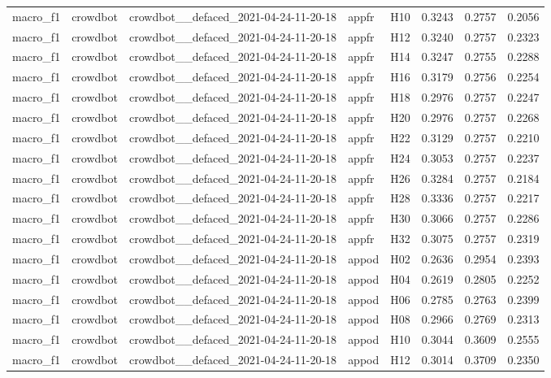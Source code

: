\begin{table}[tbp]
\begin{tabular}{lllllrrr}
macro\_f1 & crowdbot & crowdbot\_\_defaced\_2021-04-24-11-20-18 & appfr & H10 & 0.3243 & 0.2757 & 0.2056 \\
macro\_f1 & crowdbot & crowdbot\_\_defaced\_2021-04-24-11-20-18 & appfr & H12 & 0.3240 & 0.2757 & 0.2323 \\
macro\_f1 & crowdbot & crowdbot\_\_defaced\_2021-04-24-11-20-18 & appfr & H14 & 0.3247 & 0.2755 & 0.2288 \\
macro\_f1 & crowdbot & crowdbot\_\_defaced\_2021-04-24-11-20-18 & appfr & H16 & 0.3179 & 0.2756 & 0.2254 \\
macro\_f1 & crowdbot & crowdbot\_\_defaced\_2021-04-24-11-20-18 & appfr & H18 & 0.2976 & 0.2757 & 0.2247 \\
macro\_f1 & crowdbot & crowdbot\_\_defaced\_2021-04-24-11-20-18 & appfr & H20 & 0.2976 & 0.2757 & 0.2268 \\
macro\_f1 & crowdbot & crowdbot\_\_defaced\_2021-04-24-11-20-18 & appfr & H22 & 0.3129 & 0.2757 & 0.2210 \\
macro\_f1 & crowdbot & crowdbot\_\_defaced\_2021-04-24-11-20-18 & appfr & H24 & 0.3053 & 0.2757 & 0.2237 \\
macro\_f1 & crowdbot & crowdbot\_\_defaced\_2021-04-24-11-20-18 & appfr & H26 & 0.3284 & 0.2757 & 0.2184 \\
macro\_f1 & crowdbot & crowdbot\_\_defaced\_2021-04-24-11-20-18 & appfr & H28 & 0.3336 & 0.2757 & 0.2217 \\
macro\_f1 & crowdbot & crowdbot\_\_defaced\_2021-04-24-11-20-18 & appfr & H30 & 0.3066 & 0.2757 & 0.2286 \\
macro\_f1 & crowdbot & crowdbot\_\_defaced\_2021-04-24-11-20-18 & appfr & H32 & 0.3075 & 0.2757 & 0.2319 \\
macro\_f1 & crowdbot & crowdbot\_\_defaced\_2021-04-24-11-20-18 & appod & H02 & 0.2636 & 0.2954 & 0.2393 \\
macro\_f1 & crowdbot & crowdbot\_\_defaced\_2021-04-24-11-20-18 & appod & H04 & 0.2619 & 0.2805 & 0.2252 \\
macro\_f1 & crowdbot & crowdbot\_\_defaced\_2021-04-24-11-20-18 & appod & H06 & 0.2785 & 0.2763 & 0.2399 \\
macro\_f1 & crowdbot & crowdbot\_\_defaced\_2021-04-24-11-20-18 & appod & H08 & 0.2966 & 0.2769 & 0.2313 \\
macro\_f1 & crowdbot & crowdbot\_\_defaced\_2021-04-24-11-20-18 & appod & H10 & 0.3044 & 0.3609 & 0.2555 \\
macro\_f1 & crowdbot & crowdbot\_\_defaced\_2021-04-24-11-20-18 & appod & H12 & 0.3014 & 0.3709 & 0.2350 \\

\end{tabular}
\end{table}
